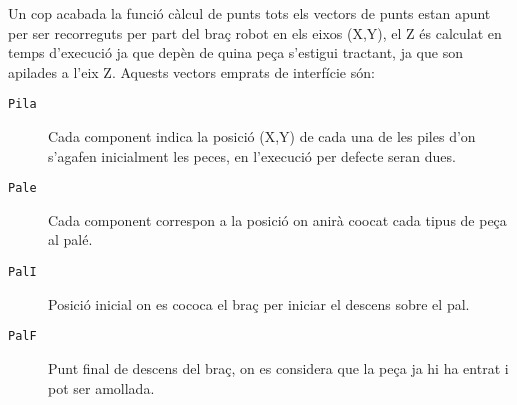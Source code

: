 Un cop acabada la funció càlcul de punts tots els vectors de punts estan apunt
per ser recorreguts per part del braç robot en els eixos (X,Y), el Z és
calculat en temps d'execució ja que depèn de quina peça s'estigui tractant,
ja que son apilades a l'eix Z.
Aquests vectors emprats de interfície són:

\begin{description}
 \item [\texttt{Pila}] Cada component indica la posició (X,Y) de cada una de
les piles d'on s'agafen
inicialment les peces, en l'execució per defecte seran dues.
 \item [\texttt{Pale}] Cada component correspon a la posició on anirà
co\lgem ocat cada tipus de peça al palé.
 \item [\texttt{PalI}] Posició inicial on es co\lgem coca el braç per iniciar
el descens sobre el pal.
 \item [\texttt{PalF}] Punt final de descens del braç, on es considera que la
peça ja hi ha entrat i pot ser amollada.
\end{description}

